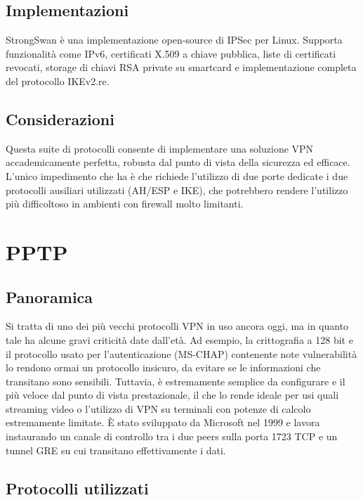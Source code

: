 \subsection{Implementazioni}
StrongSwan è una implementazione open-source di IPSec per Linux. Supporta funzionalità come IPv6, certificati X.509 a chiave pubblica, liste di certificati revocati, storage di chiavi RSA private su smartcard e implementazione completa del protocollo IKEv2.re.

\subsection{Considerazioni}
Questa suite di protocolli consente di implementare una soluzione VPN accademicamente perfetta, robusta dal punto di vista della sicurezza ed efficace. L'unico impedimento che ha è che richiede l'utilizzo di due porte dedicate i due protocolli ausiliari utilizzati (AH/ESP e IKE), che potrebbero rendere l'utilizzo più difficoltoso in ambienti con firewall molto limitanti. 

\section{PPTP}
\subsection{Panoramica}
Si tratta di uno dei più vecchi protocolli VPN in uso ancora oggi, ma in quanto tale ha alcune gravi criticità date dall'età. Ad esempio, la crittografia a 128 bit e il protocollo usato per l'autenticazione (MS-CHAP) contenente note vulnerabilità lo rendono ormai un protocollo insicuro, da evitare se le informazioni che transitano sono sensibili.
Tuttavia, è estremamente semplice da configurare e il più veloce dal punto di vista prestazionale, il che lo rende ideale per usi quali streaming video o l'utilizzo di VPN su terminali con potenze di calcolo estremamente limitate.
È stato sviluppato da Microsoft nel 1999 \cite[RFC2637]{RFC2637} e lavora instaurando un canale di controllo tra i due peers sulla porta 1723 TCP e un tunnel GRE su cui transitano effettivamente i dati.

\subsection{Protocolli utilizzati}
